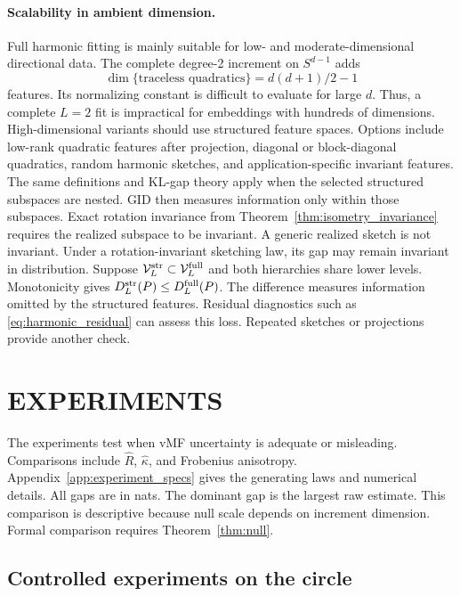 \documentclass[twoside]{article}
\theoremstyle{definition}
\theoremstyle{remark}
\newcommand{\V}{\mathcal V}
\begin{document}
\paragraph{Scalability in ambient dimension.}
Full harmonic fitting is mainly suitable for low- and moderate-dimensional directional data. The complete degree-2 increment on $S^{d-1}$ adds
\[
  \dim\{\text{traceless quadratics}\}=d(d+1)/2-1
\]
features. Its normalizing constant is difficult to evaluate for large $d$. Thus, a complete $L=2$ fit is impractical for embeddings with hundreds of dimensions. High-dimensional variants should use structured feature spaces. Options include low-rank quadratic features after projection, diagonal or block-diagonal quadratics, random harmonic sketches, and application-specific invariant features. The same definitions and KL-gap theory apply when the selected structured subspaces are nested. GID then measures information only within those subspaces. Exact rotation invariance from Theorem~\ref{thm:isometry_invariance} requires the realized subspace to be invariant. A generic realized sketch is not invariant. Under a rotation-invariant sketching law, its gap may remain invariant in distribution. Suppose $\V_L^{\rm str}\subset\V_L^{\rm full}$ and both hierarchies share lower levels. Monotonicity gives $D_L^{\rm str}(P)\le D_L^{\rm full}(P)$. The difference measures information omitted by the structured features. Residual diagnostics such as \eqref{eq:harmonic_residual} can assess this loss. Repeated sketches or projections provide another check.

\section{EXPERIMENTS}\label{sec:experiments}

The experiments test when vMF uncertainty is adequate or misleading. Comparisons include $\widehat R$, $\widehat\kappa$, and Frobenius anisotropy. Appendix~\ref{app:experiment_specs} gives the generating laws and numerical details. All gaps are in nats. The dominant gap is the largest raw estimate. This comparison is descriptive because null scale depends on increment dimension. Formal comparison requires Theorem~\ref{thm:null}.



\subsection{Controlled experiments on the circle}
\end{document}
